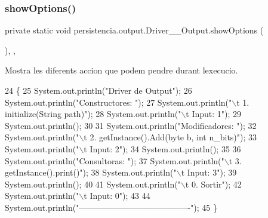 \mbox{\label{classpersistencia_1_1output_1_1Driver____Output_a73ae13b88bf305d442012408333aae35}} 
\subsubsection{\texorpdfstring{show\+Options()}{showOptions()}}
{\footnotesize\ttfamily private static void persistencia.\+output.\+Driver\+\_\+\+\_\+\+Output.\+show\+Options (\begin{DoxyParamCaption}{ }\end{DoxyParamCaption})\hspace{0.3cm}{\ttfamily [inline]}, {\ttfamily [static]}, {\ttfamily [private]}}



Mostra les diferents accion que podem pendre durant l\textquotesingle{}execucio. 


\begin{DoxyCode}
24                                      \{
25         System.out.println(\textcolor{stringliteral}{"Driver de Output"});
26         System.out.println(\textcolor{stringliteral}{"Constructores: "});
27         System.out.println(\textcolor{stringliteral}{"\(\backslash\)t 1. initialize(String path)"});
28         System.out.println(\textcolor{stringliteral}{"\(\backslash\)t Input: 1"});
29         System.out.println();
30 
31         System.out.println(\textcolor{stringliteral}{"Modificadores: "});
32         System.out.println(\textcolor{stringliteral}{"\(\backslash\)t 2. getInstance().Add(byte b, int n\_bits)"});
33         System.out.println(\textcolor{stringliteral}{"\(\backslash\)t Input: 2"});
34         System.out.println();
35 
36         System.out.println(\textcolor{stringliteral}{"Consultoras: "});
37         System.out.println(\textcolor{stringliteral}{"\(\backslash\)t 3. getInstance().print()"});
38         System.out.println(\textcolor{stringliteral}{"\(\backslash\)t Input: 3"});
39         System.out.println();
40 
41         System.out.println(\textcolor{stringliteral}{"\(\backslash\)t 0. Sortir"});
42         System.out.println(\textcolor{stringliteral}{"\(\backslash\)t Input: 0"});
43 
44         System.out.println(\textcolor{stringliteral}{"----------------------------------------"});
45     \}
\end{DoxyCode}



